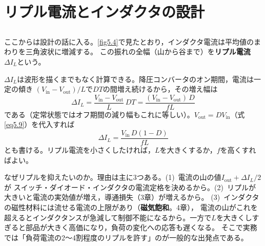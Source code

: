 \section{リプル電流とインダクタの設計}
\label{sec5.5}

\subsection{}

ここからは設計の話に入る。\ref{fig5.4}で見たとおり，インダクタ電流は平均値のまわりを三角波状に増減する。
この振れの全幅（山から谷まで）を\textbf{リプル電流}$\mathit{\Delta}I_L$という。

$\mathit{\Delta}I_L$は波形を描くまでもなく計算できる。降圧コンバータのオン期間，電流は一定の傾き
$(V_{\mathrm{in}}-V_{\mathrm{out}})/L$で$DT$の間増え続けるから，その増え幅は
\begin{equation}
\mathit{\Delta}I_L = \frac{V_{\mathrm{in}} - V_{\mathrm{out}}}{L}\, DT= \frac{(V_{\mathrm{in}} - V_{\mathrm{out}})\, D}{f L}
\label{eq5.19}
\end{equation}
である（定常状態ではオフ期間の減り幅もこれに等しい）。$V_{\mathrm{out}} = D V_{\mathrm{in}}$（式\ref{eq5.9}）を代入すれば
\begin{equation}
\mathit{\Delta}I_L = \frac{V_{\mathrm{in}}\, D (1-D)}{f L}
\label{eq5.20}
\end{equation}
とも書ける。リプル電流を小さくしたければ，$L$を大きくするか，$f$を高くすればよい。

なぜリプルを抑えたいのか。理由は主に3つある。(1)~電流の山の値$I_{\mathrm{out}} + \mathit{\Delta}I_L/2$が
スイッチ・ダイオード・インダクタの電流定格を決めるから。(2)~リプルが大きいと電流の実効値が増え，導通損失（3章）が増えるから。
(3)~インダクタの磁性材料には流せる電流の上限があり（\textbf{磁気飽和}。4章），
電流の山がこれを超えるとインダクタンスが急減して制御不能になるから。一方で$L$を大きくしすぎると部品が大きく高価になり，負荷の変化への応答も遅くなる。
そこで実務では「負荷電流の2〜4割程度のリプルを許す」のが一般的な出発点である。

